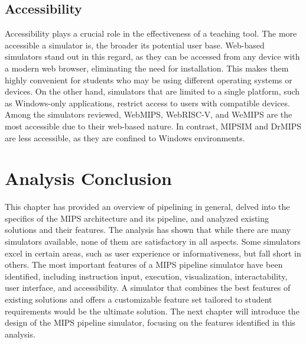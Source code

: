 \subsection{Accessibility}\label{sec:accessibility}
Accessibility plays a crucial role in the effectiveness of a teaching tool. The more accessible a simulator is, the broader its potential user base. Web-based simulators stand out in this regard, as they can be accessed from any device with a modern web browser, eliminating the need for installation. This makes them highly convenient for students who may be using different operating systems or devices. On the other hand, simulators that are limited to a single platform, such as Windows-only applications, restrict access to users with compatible devices. Among the simulators reviewed, WebMIPS, WebRISC-V, and WeMIPS are the most accessible due to their web-based nature. In contrast, MIPSIM and DrMIPS are less accessible, as they are confined to Windows environments.


\section{Analysis Conclusion}
This chapter has provided an overview of pipelining in general, delved into the specifics of the MIPS architecture and its pipeline, and analyzed existing solutions and their features. The analysis has shown that while there are many simulators available, none of them are satisfactory in all aspects. Some simulators excel in certain areas, such as user experience or informativeness, but fall short in others. The most important features of a MIPS pipeline simulator have been identified, including instruction input, execution, visualization, interactability, user interface, and accessibility. A simulator that combines the best features of existing solutions and offers a customizable feature set tailored to student requirements would be the ultimate solution. The next chapter will introduce the design of the MIPS pipeline simulator, focusing on the features identified in this analysis.